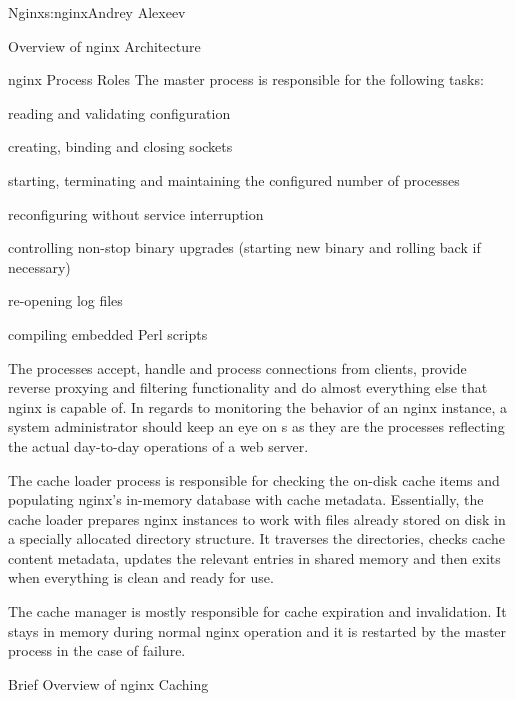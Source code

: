 \begin{aosachapter}{Nginx}{s:nginx}{Andrey Alexeev}
\begin{aosasect1}{Overview of nginx Architecture}
\begin{aosasect2}{nginx Process Roles}
The master process is responsible for the following tasks:

\begin{aosaitemize}

\item reading and validating configuration

\item creating, binding and closing sockets

\item starting, terminating and maintaining the configured number of
   processes

\item reconfiguring without service interruption

\item controlling non-stop binary upgrades (starting new binary and
rolling back if necessary)

\item re-opening log files

\item compiling embedded Perl scripts

\end{aosaitemize}

The  processes accept, handle and process connections
from clients, provide reverse proxying and filtering functionality and
do almost everything else that nginx is capable of. In regards to
monitoring the behavior of an nginx instance, a system administrator
should keep an eye on s as they are the processes
reflecting the actual day-to-day operations of a web server.

The cache loader process is responsible for checking the on-disk cache
items and populating nginx's in-memory database with cache
metadata. Essentially, the cache loader prepares nginx instances to
work with files already stored on disk in a specially allocated
directory structure. It traverses the directories, checks cache
content metadata, updates the relevant entries in shared memory and
then exits when everything is clean and ready for use.

The cache manager is mostly responsible for cache expiration and
invalidation. It stays in memory during normal nginx operation and it
is restarted by the master process in the case of failure.

\end{aosasect2}

\begin{aosasect2}{Brief Overview of nginx Caching}


\end{aosasect2}
\end{aosasect1}
\end{aosachapter}
